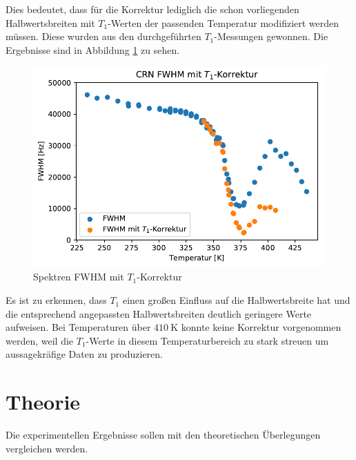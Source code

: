 Dies bedeutet, dass für die Korrektur lediglich die schon vorliegenden Halbwertsbreiten mit $T_1$-Werten der passenden Temperatur modifiziert werden müssen. Diese wurden aus den durchgeführten $T_1$-Messungen gewonnen. Die Ergebnisse sind in Abbildung \ref{fig:res:spek_fwhm_t1} zu sehen.
\begin{figure}
	\begin{center}
		\includegraphics[width=\textwidth]{graphics/plots/SPEK/spek_t1korr.pdf}
	\end{center}
	\caption{Spektren FWHM mit $T_1$-Korrektur} \label{fig:res:spek_fwhm_t1}
\end{figure}
Es ist zu erkennen, dass $T_1$ einen großen Einfluss auf die Halbwertsbreite hat und die entsprechend angepassten Halbwertsbreiten deutlich geringere Werte aufweisen. Bei Temperaturen über $\SI{410}{\kelvin}$ konnte keine Korrektur vorgenommen werden, weil die $T_1$-Werte in diesem Temperaturbereich zu stark streuen um aussagekräfige Daten zu produzieren.










\section{Theorie} \label{section:res:theorie}









Die experimentellen Ergebnisse sollen mit den theoretischen Überlegungen vergleichen werden.

